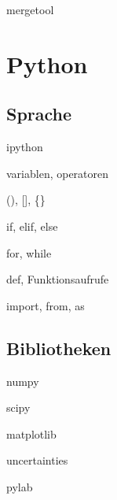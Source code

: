 \documentclass[t]{beamer}
\begin{document}
      \begin{frame}{mergetool}
      \end{frame}

  \section{Python}
    \subsection{Sprache}
      \begin{frame}{ipython}
      \end{frame}
      
      \begin{frame}{variablen, operatoren}
      \end{frame}
      
      \begin{frame}{(), [], \{\}}
      \end{frame}
      
      \begin{frame}{if, elif, else}
      \end{frame}
      
      \begin{frame}{for, while}
      \end{frame}
      
      \begin{frame}{def, Funktionsaufrufe}
      \end{frame}
      
      \begin{frame}{import, from, as}
      \end{frame}
    
    \subsection{Bibliotheken}
      \begin{frame}{numpy}
      \end{frame}
      
      \begin{frame}{scipy}
      \end{frame}
      
      \begin{frame}{matplotlib}
      \end{frame}
      
      \begin{frame}{uncertainties}
      \end{frame}
      
      \begin{frame}{pylab}
      \end{frame}
\end{document}
